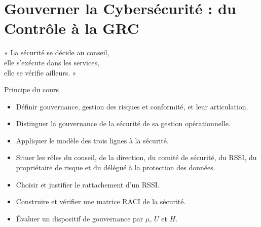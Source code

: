 
\chapter{Gouverner la Cybersécurité : du Contrôle à la GRC}
\label{chap:grc}

\epigraph{%
    « La sécurité se décide au conseil,\\
    elle s'exécute dans les services,\\
    elle se vérifie ailleurs. »%
}{Principe du cours}


\begin{boxobjectifs}
\begin{itemize}
    \item Définir gouvernance, gestion des risques et conformité, et leur
          articulation.
    \item Distinguer la gouvernance de la sécurité de sa gestion
          opérationnelle.
    \item Appliquer le modèle des trois lignes à la sécurité.
    \item Situer les rôles du conseil, de la direction, du comité de
          sécurité, du RSSI, du propriétaire de risque et du délégué à la
          protection des données.
    \item Choisir et justifier le rattachement d'un RSSI.
    \item Construire et vérifier une matrice RACI de la sécurité.
    \item Évaluer un dispositif de gouvernance par $\mu$, $U$ et $H$.
\end{itemize}
\end{boxobjectifs}

